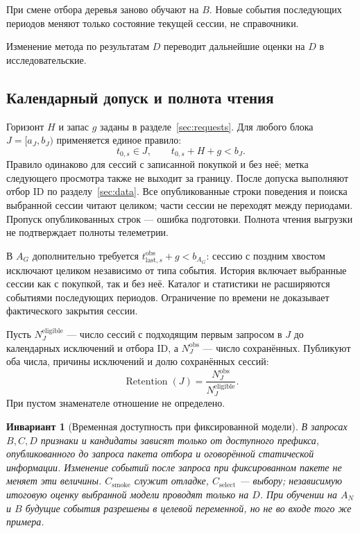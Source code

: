 \documentclass[12pt,a4paper]{article}
\theoremstyle{plainru}
\newtheorem{invariant}{Инвариант}[section]
\begin{document}
При смене отбора деревья заново обучают на $B$.
Новые события последующих периодов меняют только
состояние текущей сессии, не справочники.

Изменение метода по результатам $D$
переводит дальнейшие оценки на $D$ в исследовательские.

\subsection{Календарный допуск и полнота чтения}\label{sec:eval-maturity}

Горизонт $H$ и запас $g$ заданы в разделе~\ref{sec:requests}.
Для любого блока $J=[a_J,b_J)$ применяется единое правило:
\begin{equation}\label{eq:eval-admission}
t_{0,s}\in J,\qquad t_{0,s}+H+g<b_J.
\end{equation}
Правило одинаково для сессий с записанной покупкой и без неё;
метка следующего просмотра также не выходит за границу.
После допуска выполняют отбор ID по разделу~\ref{sec:data}.
Все опубликованные строки поведения и поиска выбранной сессии
читают целиком; части сессии не переходят между периодами.
Пропуск опубликованных строк --- ошибка подготовки.
Полнота чтения выгрузки не подтверждает полноты телеметрии.

В $A_G$ дополнительно требуется
$t_{\mathrm{last},s}^{\mathrm{obs}}+g<b_{A_G}$:
сессию с поздним хвостом исключают целиком независимо от типа события.
История включает выбранные сессии как с покупкой, так и без неё.
Каталог и статистики не расширяются событиями последующих периодов.
Ограничение по времени не доказывает фактического закрытия сессии.

Пусть $N_J^{\mathrm{eligible}}$ --- число сессий с подходящим первым
запросом в $J$ до календарных исключений и отбора ID, а
$N_J^{\mathrm{obs}}$ --- число сохранённых. Публикуют оба числа,
причины исключений и долю сохранённых сессий:
\begin{equation}\label{eq:eval-retention}
\operatorname{Retention}(J)=
\frac{N_J^{\mathrm{obs}}}{N_J^{\mathrm{eligible}}}.
\end{equation}
При пустом знаменателе отношение не определено.

\begin{invariant}[Временная доступность при фиксированной модели]
\label{inv:eval-no-leakage}
В запросах $B,C,D$ признаки и кандидаты
зависят только от доступного префикса, опубликованного до запроса
пакета отбора и оговорённой статической информации.
Изменение событий после запроса при фиксированном пакете
не меняет эти величины. $C_{\mathrm{smoke}}$ служит отладке,
$C_{\mathrm{select}}$ --- выбору; независимую итоговую
оценку выбранной модели проводят только на $D$.
При обучении на $A_N$ и $B$ будущие события разрешены
в целевой переменной, но не во входе того же примера.
\end{invariant}
\end{document}
